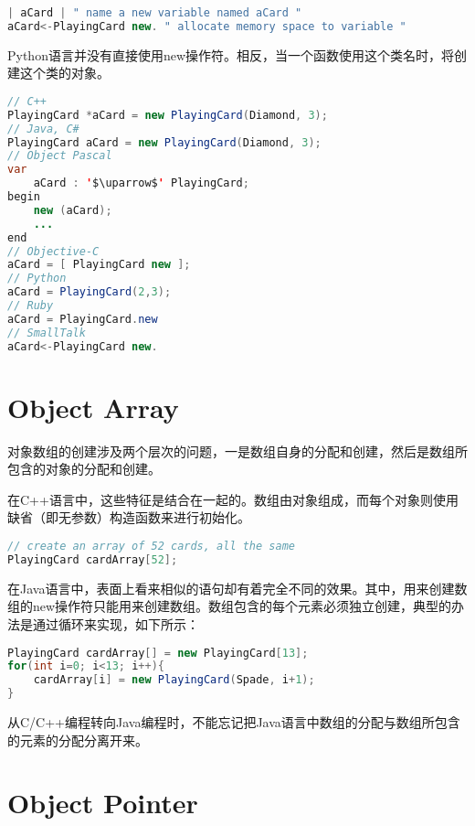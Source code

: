 \begin{lstlisting}[language=Java]
| aCard | " name a new variable named aCard "
aCard<-PlayingCard new. " allocate memory space to variable "
\end{lstlisting}

Python语言并没有直接使用new操作符。相反，当一个函数使用这个类名时，将创建这个类的对象。



\begin{lstlisting}[language=Java]
// C++
PlayingCard *aCard = new PlayingCard(Diamond, 3);
// Java, C#
PlayingCard aCard = new PlayingCard(Diamond, 3);
// Object Pascal
var
	aCard : '$\uparrow$' PlayingCard;
begin
	new (aCard);
	...
end
// Objective-C
aCard = [ PlayingCard new ];
// Python
aCard = PlayingCard(2,3);
// Ruby
aCard = PlayingCard.new
// SmallTalk
aCard<-PlayingCard new.
\end{lstlisting}


\section{Object Array}


对象数组的创建涉及两个层次的问题，一是数组自身的分配和创建，然后是数组所包含的对象的分配和创建。

在C++语言中，这些特征是结合在一起的。数组由对象组成，而每个对象则使用缺省（即无参数）构造函数来进行初始化。



\begin{lstlisting}[language=C++]
// create an array of 52 cards, all the same
PlayingCard cardArray[52];
\end{lstlisting}

在Java语言中，表面上看来相似的语句却有着完全不同的效果。其中，用来创建数组的new操作符只能用来创建数组。数组包含的每个元素必须独立创建，典型的办法是通过循环来实现，如下所示：



\begin{lstlisting}[language=Java]
PlayingCard cardArray[] = new PlayingCard[13];
for(int i=0; i<13; i++){
	cardArray[i] = new PlayingCard(Spade, i+1);
}
\end{lstlisting}


从C/C++编程转向Java编程时，不能忘记把Java语言中数组的分配与数组所包含的元素的分配分离开来。


\section{Object Pointer}

